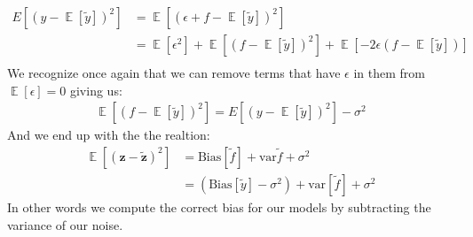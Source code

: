 \documentclass[12pt]{article}
\DeclareMathOperator*{\E}{\mathbb{E}}
\begin{document}
\begin{align*}
  E[(y - \E[\tilde{y}])^2] &= \E[(\epsilon + f - \E[\tilde{y}])^2] \\
                           &= \E[\epsilon^2] + \E[(f- \E[\tilde{y}])^2] + \E[-2\epsilon(f- \E[\tilde{y}])] \\
\end{align*}
We recognize once again that we can remove terms that have $\epsilon$ in them from $\E[\epsilon] = 0$ giving us:
\begin{align*}
  \E[(f- \E[\tilde{y}])^2] =   E[(y - \E[\tilde{y}])^2] - \sigma^2
\end{align*}
And we end up with the the realtion:
\begin{align*}
  \E[(\boldsymbol{z}- \boldsymbol{\tilde{z}})^2] &= \text{Bias}[\tilde{f}] + \text{var}{\tilde{f}} + \sigma^2\\
   &=   (\text{Bias}[\tilde{y}] - \sigma^2) + \text{var}[\tilde{f}] + \sigma^2
\end{align*}
In other words we compute the correct bias for our models by subtracting the variance of our noise.
\end{document}
